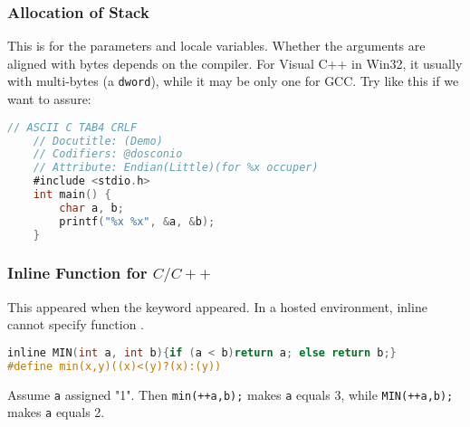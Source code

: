 \subsubsection{Allocation of Stack}

This is for the parameters and locale variables. Whether the arguments are aligned with bytes depends on the compiler. For Visual C++ in Win32, it usually with multi-bytes (a \verb`dword`), while it may be  only one for GCC. Try like this if we want to assure:

\lstset{style=GlobalC}
\begin{lstlisting}[language=C]
	// ASCII C TAB4 CRLF
	// Docutitle: (Demo) 
	// Codifiers: @dosconio
	// Attribute: Endian(Little)(for %x occuper)
	#include <stdio.h>
	int main() {
		char a, b;
		printf("%x %x", &a, &b);
	}
\end{lstlisting}

\subsubsection{Inline Function for $C/C++$}

This appeared when the keyword  appeared.
In a hosted environment, inline cannot specify function .

\lstset{style=GlobalC}
\begin{lstlisting}[language=C]
inline MIN(int a, int b){if (a < b)return a; else return b;}
#define min(x,y)((x)<(y)?(x):(y))
\end{lstlisting}
Assume \verb|a| assigned "1". Then
\verb`min(++a,b);` makes \verb|a| equals 3, while
\verb`MIN(++a,b);` makes \verb|a| equals 2.

